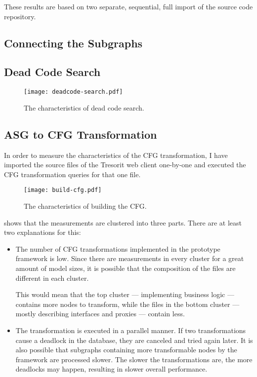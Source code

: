 These results are based on two separate, sequential, full import of the source code repository.

\subsection{Connecting the Subgraphs}


\subsection{Dead Code Search}

\begin{figure}[!htb]
  \centering
  \texttt{[image: deadcode-search.pdf]}
  \caption{The characteristics of dead code search.}
  \label{fig:deadcode-search}
\end{figure}

\subsection{ASG to CFG Transformation}
In order to measure the characteristics of the CFG transformation, I have imported the source files of the Tresorit web client one-by-one and executed the CFG transformation queries for that one file.

\begin{figure}[!htb]
  \centering
  \texttt{[image: build-cfg.pdf]}
  \caption{The characteristics of building the CFG.}
  \label{fig:build-cfg}
\end{figure}

 shows that the measurements are clustered into three parts. There are at least two explanations for this:

\begin{itemize}[topsep=0pt]
  \item The number of CFG transformations implemented in the prototype framework is low. Since there are measurements in every cluster for a great amount of model sizes, it is possible that the composition of the files are different in each cluster.

  This would mean that the top cluster --- implementing business logic --- contains more nodes to transform, while the files in the bottom cluster --- mostly describing interfaces and proxies --- contain less.

  \item The transformation is executed in a parallel manner. If two transformations cause a deadlock in the database, they are canceled and tried again later. It is also possible that subgraphs containing more transformable nodes by the framework are processed slower. The slower the transformations are, the more deadlocks may happen, resulting in slower overall performance.
\end{itemize}

